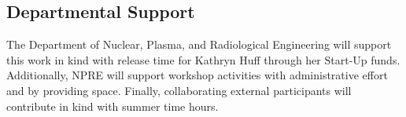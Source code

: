 \documentclass[11pt]{article}
\begin{document}
          \subsection*{Departmental Support}
          The Department of Nuclear, Plasma, and Radiological Engineering will 
          support this work in kind with release time for Kathryn Huff through 
          her Start-Up funds.  Additionally, NPRE will support workshop activities 
          with administrative effort and by providing space. Finally, 
          collaborating external participants will contribute in kind with 
          summer time hours.


          
          

          
\end{document}
